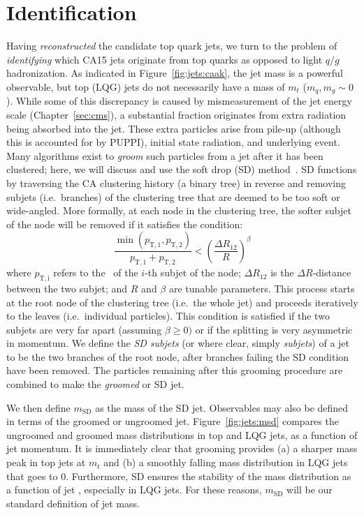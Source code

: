 \section{Identification}
\label{sec:jets:id}

Having \emph{reconstructed} the candidate top quark jets, we turn to the problem of \emph{identifying} which CA15 jets originate from top quarks as opposed to light $q/g$ hadronization. 
As indicated in Figure~\ref{fig:jets:caak}, the jet mass is a powerful observable, but top (LQG) jets do not necessarily have a mass of $m_t$ ($m_q,m_g\sim 0$). 
While some of this discrepancy is caused by mismeasurement of the jet energy scale (Chapter~\ref{sec:cms}), a substantial fraction originates from extra radiation being absorbed into the jet.
These extra particles arise from pile-up (although this is accounted for by PUPPI), initial state radiation, and underlying event.
Many algorithms exist to \emph{groom} such particles from a jet after it has been clustered; here, we will discuss and use the soft drop (SD) method~\needcite.
SD functions by traversing the CA clustering history (a binary tree) in reverse and removing subjets (i.e.~branches) of the clustering tree that are deemed to be too soft or wide-angled.
More formally, at each node in the clustering tree, the softer subjet of the node will be removed if it satisfies the condition:
\begin{equation}
    \frac{\min(p_\mathrm{T,1},p_\mathrm{T,2})}{p_\mathrm{T,1}+p_\mathrm{T,2}} < 
    \left(\frac{\Delta R_{12}}{R}\right)^\beta
\end{equation}
where $p_\mathrm{T,i}$ refers to the \pt~of the $i$-th subjet of the node; $\Delta R_{12}$ is the $\Delta R$-distance between the two subjet; and $R$ and $\beta$ are tunable parameters. 
This process starts at the root node of the clustering tree (i.e.~the whole jet) and proceeds iteratively to the leaves (i.e.~individual particles).
This condition is satisfied if the two subjets are very far apart (assuming $\beta \geq 0)$ or if the splitting is very asymmetric in momentum. 
We define the \emph{SD subjets} (or where clear, simply \emph{subjets}) of a jet to be the two branches of the root node, after branches failing the SD condition have been removed. 
The particles remaining after this grooming procedure are combined to make the \emph{groomed} or SD jet. 

We then define $m_\mathrm{SD}$ as the mass of the SD jet. 
Observables may also be defined in terms of the groomed or ungroomed jet. 
Figure~\ref{fig:jets:msd} compares the ungroomed and groomed mass distributions in top and LQG jets, as a function of jet momentum. 
It is immediately clear that grooming provides (a) a sharper mass peak in top jets at $m_t$ and (b) a smoothly falling mass distribution in LQG jets that goes to 0.
Furthermore, SD ensures the stability of the mass distribution as a function of jet \pt, especially in LQG jets.
For these reasons, $m_\mathrm{SD}$ will be our standard definition of jet mass. 



